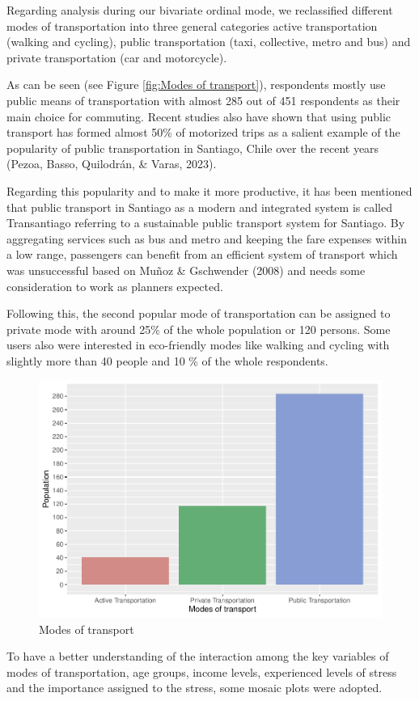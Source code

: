 \documentclass[
11pt, %
oneside, %
english, %
singlespacing, %
]{macthesis} %
\begin{document}
Regarding analysis during our bivariate ordinal mode, we reclassified different modes of transportation into three general categories active transportation (walking and cycling), public transportation (taxi, collective, metro and bus) and private transportation (car and motorcycle).

As can be seen (see Figure \ref{fig:Modes of transport}), respondents mostly use public means of transportation with almost 285 out of 451 respondents as their main choice for commuting. Recent studies also have shown that using public transport has formed almost 50\% of motorized trips as a salient example of the popularity of public transportation in Santiago, Chile over the recent years (Pezoa, Basso, Quilodrán, \& Varas, 2023).

Regarding this popularity and to make it more productive, it has been mentioned that public transport in Santiago as a modern and integrated system is called Transantiago referring to a sustainable public transport system for Santiago. By aggregating services such as bus and metro and keeping the fare expenses within a low range, passengers can benefit from an efficient system of transport which was unsuccessful based on Muñoz \& Gschwender (2008) and needs some consideration to work as planners expected.

Following this, the second popular mode of transportation can be assigned to private mode with around 25\% of the whole population or 120 persons. Some users also were interested in eco-friendly modes like walking and cycling with slightly more than 40 people and 10 \% of the whole respondents.
\begin{figure}

{\centering \includegraphics[width=0.85\linewidth]{thesis_files/figure-latex/unnamed-chunk-24-1} 

}

\caption{\label{fig:Modes of transport}Modes of transport}\label{fig:unnamed-chunk-24}
\end{figure}
To have a better understanding of the interaction among the key variables of modes of transportation, age groups, income levels, experienced levels of stress and the importance assigned to the stress, some mosaic plots were adopted.
\end{document}
